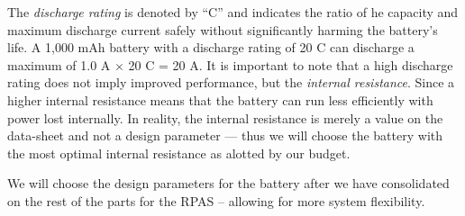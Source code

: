 The \textit{discharge rating} is denoted by ``C'' and indicates the ratio of he capacity and maximum discharge current safely without significantly harming the battery's life. A 1,000 
mAh battery with a discharge rating of 20 C can discharge a maximum of 1.0 A $\times$ 20 C = 20 A. It is important to note that a high discharge rating does not imply improved performance, but the \textit{internal resistance}. Since a higher internal resistance means that the battery can run less efficiently with power lost internally\cite{battery-c}. In reality, the internal resistance is merely a value on the data-sheet and not a design parameter --- thus we will choose the battery with the most optimal internal resistance as alotted by our budget. 

We will choose the design parameters for the battery after we have consolidated on the rest of the parts for the RPAS -- allowing for more system flexibility.
